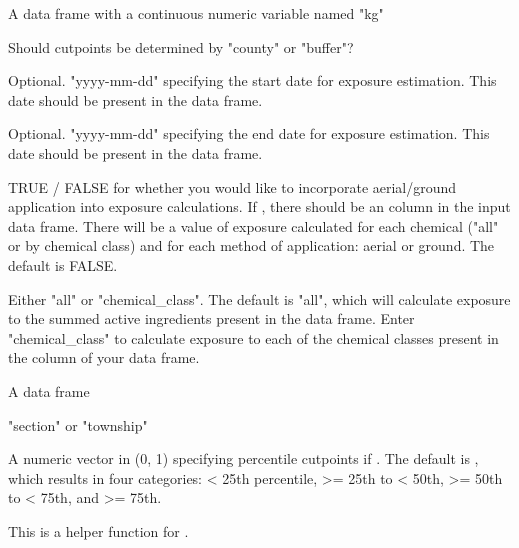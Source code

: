 \documentclass[a4paper]{book}
\begin{document}
%
\begin{Arguments}
\begin{ldescription}
\item[\code{section\_data}] A data frame with a continuous numeric variable named "kg"

\item[\code{buffer\_or\_county}] Should cutpoints be determined by "county" or "buffer"?

\item[\code{start\_date}] Optional. "yyyy-mm-dd" specifying the start date for
exposure estimation. This date should be present in the 
data frame.

\item[\code{end\_date}] Optional. "yyyy-mm-dd" specifying the end date for exposure
estimation. This date should be present in the 
data frame.

\item[\code{aerial\_ground}] TRUE / FALSE for whether you would like to
incorporate aerial/ground application into exposure calculations. If
, there should be an 
column in the input  data frame. There will be a value of
exposure calculated for each chemical ("all" or by chemical class) and for
each method of application: aerial or ground. The default is FALSE.

\item[\code{chemicals}] Either "all" or "chemical\_class". The default is "all", which
will calculate exposure to the summed active ingredients present in the
 data frame. Enter "chemical\_class" to calculate
exposure to each of the chemical classes present in the 
column of your  data frame.

\item[\code{clean\_pur}] A  data frame

\item[\code{s\_t}] "section" or "township"

\item[\code{percentile}] A numeric vector in (0, 1) specifying percentile cutpoints
if . The default is ,
which results in four categories: < 25th percentile, >= 25th to < 50th,
>= 50th to < 75th, and >= 75th.
\end{ldescription}
\end{Arguments}
%
\begin{Details}\relax
This is a helper function for .
\end{Details}
\end{document}
